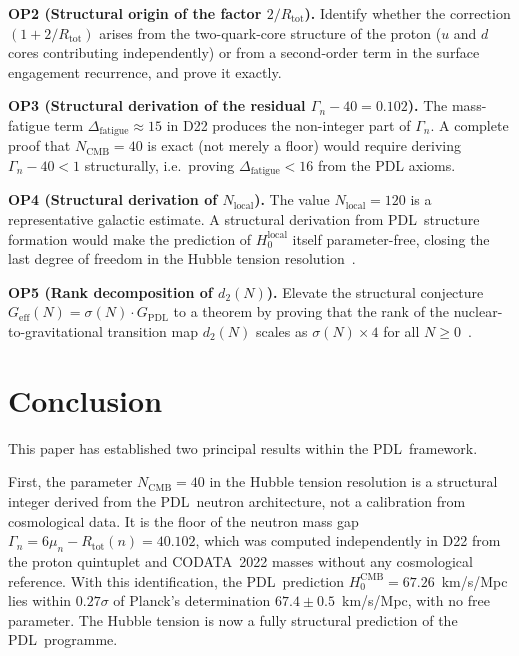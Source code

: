 \documentclass[11pt,a4paper]{article}
\theoremstyle{definition}
\newcommand{\PDL}{\textnormal{PDL}}
\newcommand{\Rtot}{R_{\mathrm{tot}}}
\newcommand{\Geff}{G_{\mathrm{eff}}}
\newcommand{\GPDL}{G_{\mathrm{PDL}}}
\newcommand{\Hzero}{H_0}
\newcommand{\sig}{\sigma}
\begin{document}
\medskip\noindent\textbf{OP2 (Structural origin of the factor $2/\Rtot$).} Identify whether the correction $(1 + 2/\Rtot)$ arises from the two-quark-core structure of the proton ($u$ and $d$ cores contributing independently) or from a second-order term in the surface engagement recurrence, and prove it exactly.

\medskip\noindent\textbf{OP3 (Structural derivation of the residual $\Gamma_n - 40 = 0.102$).} The mass-fatigue term $\Delta_{\mathrm{fatigue}} \approx 15$ in D22 produces the non-integer part of $\Gamma_n$. A complete proof that $N_{\mathrm{CMB}} = 40$ is exact (not merely a floor) would require deriving $\Gamma_n - 40 < 1$ structurally, i.e.\ proving $\Delta_{\mathrm{fatigue}} < 16$ from the PDL axioms.

\medskip\noindent\textbf{OP4 (Structural derivation of $N_{\mathrm{local}}$).} The value $N_{\mathrm{local}} = 120$ is a representative galactic estimate. A structural derivation from \PDL\ structure formation would make the prediction of $\Hzero^{\mathrm{local}}$ itself parameter-free, closing the last degree of freedom in the Hubble tension resolution~\cite{Hubble_Resolution_PDL_2026}.

\medskip\noindent\textbf{OP5 (Rank decomposition of $d_2(N)$).} Elevate the structural conjecture $\Geff(N) = \sig(N)\cdot\GPDL$ to a theorem by proving that the rank of the nuclear-to-gravitational transition map $d_2(N)$ scales as $\sig(N)\times 4$ for all $N \geq 0$~\cite{Hubble_Resolution_PDL_2026}.

\section*{Conclusion}

This paper has established two principal results within the \PDL\ framework.

First, the parameter $N_{\mathrm{CMB}} = 40$ in the Hubble tension resolution is a structural integer derived from the \PDL\ neutron architecture, not a calibration from cosmological data. It is the floor of the neutron mass gap $\Gamma_n = 6\mu_n - \Rtot(n) = 40.102$, which was computed independently in D22 from the proton quintuplet and CODATA~2022 masses without any cosmological reference. With this identification, the \PDL\ prediction $\Hzero^{\mathrm{CMB}} = 67.26$~km/s/Mpc lies within $0.27\sigma$ of Planck's determination $67.4 \pm 0.5$~km/s/Mpc, with no free parameter. The Hubble tension is now a fully structural prediction of the \PDL\ programme.
\end{document}
